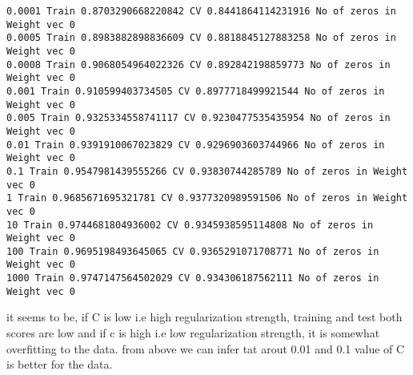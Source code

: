 \documentclass[11pt]{article}
\begin{document}
    \begin{Verbatim}[commandchars=\\\{\}]
0.0001 Train 0.8703290668220842 CV 0.8441864114231916 No of zeros in Weight vec 0
0.0005 Train 0.8983882898836609 CV 0.8818845127883258 No of zeros in Weight vec 0
0.0008 Train 0.9068054964022326 CV 0.892842198859773 No of zeros in Weight vec 0
0.001 Train 0.910599403734505 CV 0.8977718499921544 No of zeros in Weight vec 0
0.005 Train 0.9325334558741117 CV 0.9230477535435954 No of zeros in Weight vec 0
0.01 Train 0.9391910067023829 CV 0.9296903603744966 No of zeros in Weight vec 0
0.1 Train 0.9547981439555266 CV 0.93830744285789 No of zeros in Weight vec 0
1 Train 0.9685671695321781 CV 0.9377320989591506 No of zeros in Weight vec 0
10 Train 0.9744681804936002 CV 0.9345938595114808 No of zeros in Weight vec 0
100 Train 0.9695198493645065 CV 0.9365291071708771 No of zeros in Weight vec 0
1000 Train 0.9747147564502029 CV 0.934306187562111 No of zeros in Weight vec 0

    \end{Verbatim}

    it seems to be, if C is low i.e high regularization strength, training
and test both scores are low and if c is high i.e low regularization
strength, it is somewhat overfitting to the data. from above we can
infer tat arout 0.01 and 0.1 value of C is better for the data.
\end{document}
